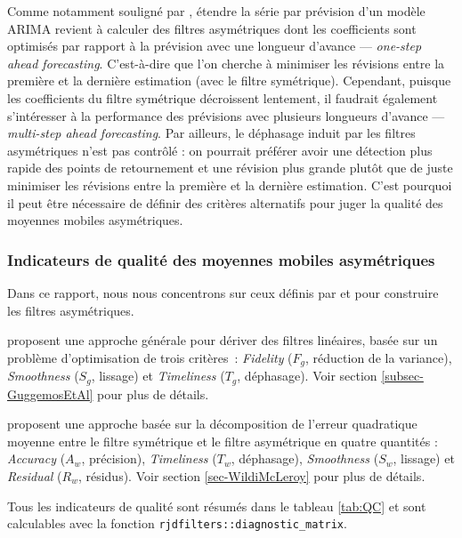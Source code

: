 \documentclass[
  11pt,
  french,
  a4paper]{article}
\newcommand\1{\mathds{1}}
\begin{document}
Comme notamment souligné par \textcite{wildischis2004}, étendre la série par prévision d'un modèle ARIMA revient à calculer des filtres asymétriques dont les coefficients sont optimisés par rapport à la prévision avec une longueur d'avance --- \emph{one-step ahead forecasting}.
C'est-à-dire que l'on cherche à minimiser les révisions entre la première et la dernière estimation (avec le filtre symétrique).
Cependant, puisque les coefficients du filtre symétrique décroissent lentement, il faudrait également s'intéresser à la performance des prévisions avec plusieurs longueurs d'avance --- \emph{multi-step ahead forecasting}.
Par ailleurs, le déphasage induit par les filtres asymétriques n'est pas contrôlé : on pourrait préférer avoir une détection plus rapide des points de retournement et une révision plus grande plutôt que de juste minimiser les révisions entre la première et la dernière estimation.
C'est pourquoi il peut être nécessaire de définir des critères alternatifs pour juger la qualité des moyennes mobiles asymétriques.

\hypertarget{indicateurs-de-qualituxe9-des-moyennes-mobiles-asymuxe9triques}{%
\subsubsection{Indicateurs de qualité des moyennes mobiles asymétriques}\label{indicateurs-de-qualituxe9-des-moyennes-mobiles-asymuxe9triques}}

Dans ce rapport, nous nous concentrons sur ceux définis par \textcite{ch15HBSA} et \textcite{trilemmaWMR2019} pour construire les filtres asymétriques.

\textcite{ch15HBSA} proposent une approche générale pour dériver des filtres linéaires, basée sur un problème d'optimisation de trois critères~: \emph{Fidelity} (\(F_g\), réduction de la variance), \emph{Smoothness} (\(S_g\), lissage) et \emph{Timeliness} (\(T_g\), déphasage).
Voir section \ref{subsec-GuggemosEtAl} pour plus de détails.

\textcite{trilemmaWMR2019} proposent une approche basée sur la décomposition de l'erreur quadratique moyenne entre le filtre symétrique et le filtre asymétrique en quatre quantités : \emph{Accuracy} (\(A_w\), précision), \emph{Timeliness} (\(T_w\), déphasage), \emph{Smoothness} (\(S_w\), lissage) et \emph{Residual} (\(R_w\), résidus).
Voir section \ref{sec-WildiMcLeroy} pour plus de détails.

Tous les indicateurs de qualité sont résumés dans le tableau \ref{tab:QC} et sont calculables avec la fonction \texttt{rjdfilters::diagnostic\_matrix}.
\end{document}
